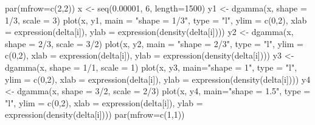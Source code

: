 \begin{Schunk}
\begin{Sinput}
 par(mfrow=c(2,2))
 x <- seq(0.00001, 6, length=1500)
 y1 <- dgamma(x, shape = 1/3, scale = 3)
 plot(x, y1, main = "shape = 1/3", type = "l", ylim = c(0,2), 
       xlab = expression(delta[i]),
       ylab = expression(density(delta[i])))
 y2 <- dgamma(x, shape = 2/3, scale = 3/2)
 plot(x, y2, main = "shape = 2/3", type = "l", ylim = c(0,2), 
       xlab = expression(delta[i]),
       ylab = expression(density(delta[i])))
 y3 <- dgamma(x, shape = 1/1, scale = 1)
 plot(x, y3, main="shape = 1", type = "l", ylim = c(0,2), 
       xlab = expression(delta[i]),
       ylab = expression(density(delta[i])))
 y4 <- dgamma(x, shape = 3/2, scale = 2/3)
 plot(x, y4, main="shape = 1.5", type = "l", ylim = c(0,2), 
       xlab = expression(delta[i]),
       ylab = expression(density(delta[i])))
 par(mfrow=c(1,1))
\end{Sinput}
\end{Schunk}
